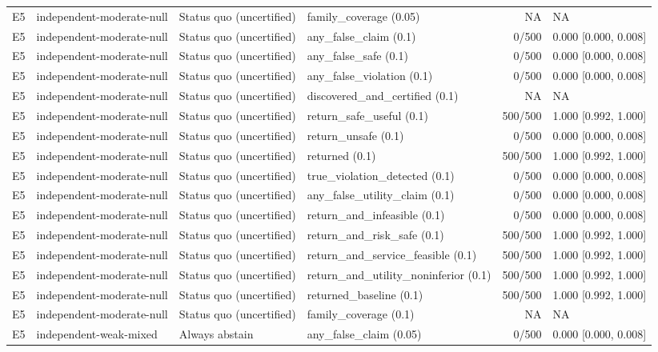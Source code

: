 \begin{longtable}{p{.04\linewidth}p{.18\linewidth}p{.19\linewidth}p{.16\linewidth}r p{.21\linewidth}}
E5 & independent-moderate-null & Status quo (uncertified) & family\_coverage (0.05) & NA & NA\\
E5 & independent-moderate-null & Status quo (uncertified) & any\_false\_claim (0.1) & 0/500 & 0.000 [0.000, 0.008]\\
E5 & independent-moderate-null & Status quo (uncertified) & any\_false\_safe (0.1) & 0/500 & 0.000 [0.000, 0.008]\\
E5 & independent-moderate-null & Status quo (uncertified) & any\_false\_violation (0.1) & 0/500 & 0.000 [0.000, 0.008]\\
E5 & independent-moderate-null & Status quo (uncertified) & discovered\_and\_certified (0.1) & NA & NA\\
E5 & independent-moderate-null & Status quo (uncertified) & return\_safe\_useful (0.1) & 500/500 & 1.000 [0.992, 1.000]\\
E5 & independent-moderate-null & Status quo (uncertified) & return\_unsafe (0.1) & 0/500 & 0.000 [0.000, 0.008]\\
E5 & independent-moderate-null & Status quo (uncertified) & returned (0.1) & 500/500 & 1.000 [0.992, 1.000]\\
E5 & independent-moderate-null & Status quo (uncertified) & true\_violation\_detected (0.1) & 0/500 & 0.000 [0.000, 0.008]\\
E5 & independent-moderate-null & Status quo (uncertified) & any\_false\_utility\_claim (0.1) & 0/500 & 0.000 [0.000, 0.008]\\
E5 & independent-moderate-null & Status quo (uncertified) & return\_and\_infeasible (0.1) & 0/500 & 0.000 [0.000, 0.008]\\
E5 & independent-moderate-null & Status quo (uncertified) & return\_and\_risk\_safe (0.1) & 500/500 & 1.000 [0.992, 1.000]\\
E5 & independent-moderate-null & Status quo (uncertified) & return\_and\_service\_feasible (0.1) & 500/500 & 1.000 [0.992, 1.000]\\
E5 & independent-moderate-null & Status quo (uncertified) & return\_and\_utility\_noninferior (0.1) & 500/500 & 1.000 [0.992, 1.000]\\
E5 & independent-moderate-null & Status quo (uncertified) & returned\_baseline (0.1) & 500/500 & 1.000 [0.992, 1.000]\\
E5 & independent-moderate-null & Status quo (uncertified) & family\_coverage (0.1) & NA & NA\\
E5 & independent-weak-mixed & Always abstain & any\_false\_claim (0.05) & 0/500 & 0.000 [0.000, 0.008]\\

\end{longtable}
